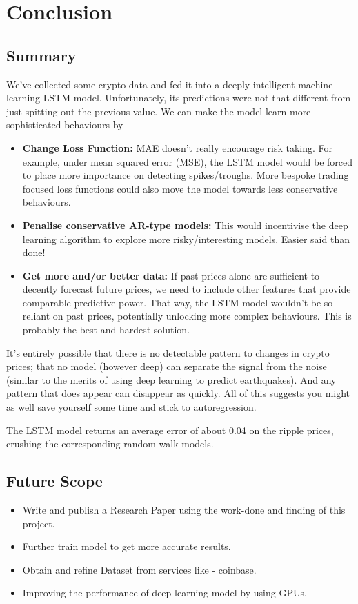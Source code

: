 \chapter{Conclusion}

\section{Summary}
We've collected some crypto data and fed it into a deeply intelligent machine learning LSTM model. Unfortunately, its predictions were not that different from just spitting out the previous value. We can make the model learn more sophisticated behaviours by - \\
    \begin{itemize}
        \item \textbf{Change Loss Function:} MAE doesn't really encourage risk taking. For example, under mean squared error (MSE), the LSTM model would be forced to place more importance on detecting spikes/troughs. More bespoke trading focused loss functions could also move the model towards less conservative behaviours.

        \item \textbf{Penalise conservative AR-type models:} This would incentivise the deep learning algorithm to explore more risky/interesting models. Easier said than done!

        \item \textbf{Get more and/or better data:} If past prices alone are sufficient to decently forecast future prices, we need to include other features that provide comparable predictive power. That way, the LSTM model wouldn't be so reliant on past prices, potentially unlocking more complex behaviours. This is probably the best and hardest solution.
    \end{itemize}
It's entirely possible that there is no detectable pattern to changes in crypto prices; that no model (however deep) can separate the signal from the noise (similar to the merits of using deep learning to predict earthquakes). And any pattern that does appear can disappear as quickly. All of this suggests you might as well save yourself some time and stick to autoregression.


The LSTM model returns an average error of about 0.04 on the ripple prices, crushing the corresponding random walk models.


\section{Future Scope}

\begin{itemize}
    \item Write and publish a Research Paper using the work-done and finding of this project.
    \item Further train model to get more accurate results.
    \item Obtain and refine Dataset from services like - coinbase.
    \item Improving the performance of deep learning model by using GPUs.
\end{itemize}